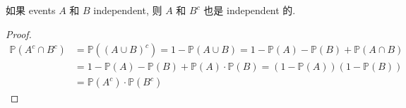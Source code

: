 \begin{proposition}
    如果 events \(A\) 和 \(B\) independent, 则 \(A\) 和 \(B^c\) 也是 independent 的.
\end{proposition}
\begin{proof}
\[
\begin{aligned}
\mathbb{P}\left(A^c \cap B^c\right) & =\mathbb{P}\left((A \cup B)^c\right)=1-\mathbb{P}(A \cup B)=1-\mathbb{P}(A)-\mathbb{P}(B)+\mathbb{P}(A \cap B) \\
& =1-\mathbb{P}(A)-\mathbb{P}(B)+\mathbb{P}(A) \cdot \mathbb{P}(B) = (1-\mathbb{P}(A))(1-\mathbb{P}(B)) \\
& =\mathbb{P}\left(A^c\right) \cdot \mathbb{P}\left(B^c\right)
\end{aligned}
\]
\end{proof}


